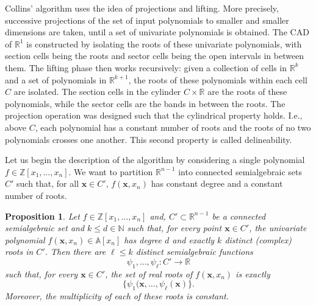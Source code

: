 \documentclass[
]{book}
\newtheorem{proposition}{Proposition}[chapter]
\theoremstyle{definition}
\theoremstyle{definition}
\theoremstyle{definition}
\theoremstyle{definition}
\theoremstyle{remark}
\begin{document}
Collins' algorithm uses the idea of projections and lifting. More precisely, successive projections of the set of input polynomials to smaller and smaller dimensions are taken, until a set of univariate polynomials is obtained. The CAD of \(\mathbb{R}^1\) is constructed by isolating the roots of these univariate polynomials, with section cells being the roots and sector cells being the open intervals in between them. The lifting phase then works recursively: given a collection of cells in \(\mathbb{R}^k\) and a set of polynomials in \(\mathbb{R}^{k+1}\), the roots of these polynomials within each cell \(C\) are isolated. The section cells in the cylinder \(C \times \mathbb{R}\) are the roots of these polynomials, while the sector cells are the bands in between the roots. The projection operation was designed such that the cylindrical property holds. I.e., above \(C\), each polynomial has a constant number of roots and the roots of no two polynomials crosses one another. This second property is called delineability.

Let us begin the description of the algorithm by considering a single polynomial \(f \in \mathbb{Z}[x_1,\ldots,x_n]\).
We want to partition \(\mathbb{R}^{n-1}\) into connected semialgebraic sets \(C'\) such that, for all \(\mathbf{x} \in C'\), \(f(\mathbf{x},x_n)\) has constant degree and a constant number of roots.

\begin{proposition}
\protect\hypertarget{prp:coste-polynomial-to-cell}{}\label{prp:coste-polynomial-to-cell}\citep[Proposition 2.16]{coste2000}
Let \(f \in \mathbb{Z}[x_1,\ldots,x_n]\) and, \(C' \subset \mathbb{R}^{n-1}\) be a connected semialgebraic set and \(k \le d \in \mathbb{N}\) such that, for every point \(\mathbf{x} \in C'\), the univariate polynomial \(f(\mathbf{x},x_n) \in \mathbb{A}[x_n]\) has degree \(d\) and exactly \(k\) distinct (complex) roots in \(C'\).
Then there are \(\ell \le k\) distinct semialgebraic functions
\[\psi_1,\ldots,\psi_\ell : C' \to \mathbb{R}
\]
such that, for every \(\mathbf{x} \in C'\), the set of real roots of \(f(\mathbf{x},x_n)\) is exactly
\[\{ \psi_1(\mathbf{x}, \ldots, \psi_\ell(\mathbf{x}) \}.\]
Moreover, the multiplicity of each of these roots is constant.
\end{proposition}
\end{document}
